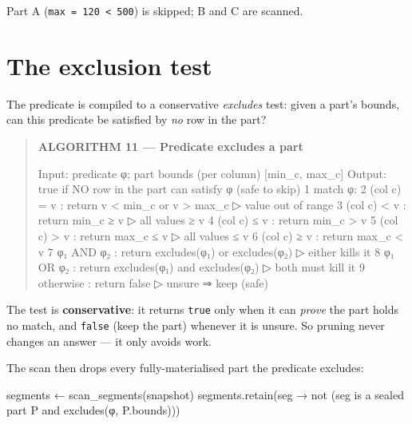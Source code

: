 \documentclass[
  11pt,
  openany]{book}
\newenvironment{Shaded}{}{}
\newcommand{\NormalTok}[1]{#1}
\begin{document}
Part A (\texttt{max\ =\ 120\ \textless{}\ 500}) is skipped; B and C are
scanned.

\section{The exclusion test}\label{the-exclusion-test}

The predicate is compiled to a conservative \emph{excludes} test: given
a part's bounds, can this predicate be satisfied by \emph{no} row in the
part?

\begin{quote}
\textbf{ALGORITHM 11 --- Predicate excludes a part}

\begin{Shaded}
\begin{Highlighting}[]
\NormalTok{Input:  predicate φ; part bounds (per column) [min\_c, max\_c]}
\NormalTok{Output: true if NO row in the part can satisfy φ (safe to skip)}
\NormalTok{1  match φ:}
\NormalTok{2    (col c) = v :  return v \textless{} min\_c  or  v \textgreater{} max\_c        ▷ value out of range}
\NormalTok{3    (col c) \textless{} v :  return min\_c ≥ v                        ▷ all values ≥ v}
\NormalTok{4    (col c) ≤ v :  return min\_c \textgreater{} v}
\NormalTok{5    (col c) \textgreater{} v :  return max\_c ≤ v                        ▷ all values ≤ v}
\NormalTok{6    (col c) ≥ v :  return max\_c \textless{} v}
\NormalTok{7    φ₁ AND φ₂ :  return excludes(φ₁) or excludes(φ₂)       ▷ either kills it}
\NormalTok{8    φ₁ OR  φ₂ :  return excludes(φ₁) and excludes(φ₂)      ▷ both must kill it}
\NormalTok{9    otherwise :  return false                              ▷ unsure ⇒ keep (safe)}
\end{Highlighting}
\end{Shaded}
\end{quote}

The test is \textbf{conservative}: it returns \texttt{true} only when it
can \emph{prove} the part holds no match, and \texttt{false} (keep the
part) whenever it is unsure. So pruning never changes an answer --- it
only avoids work.

The scan then drops every fully-materialised part the predicate
excludes:

\begin{Shaded}
\begin{Highlighting}[]
\NormalTok{segments ← scan\_segments(snapshot)}
\NormalTok{segments.retain(seg → not (seg is a sealed part P and excludes(φ, P.bounds)))}
\end{Highlighting}
\end{Shaded}
\end{document}
